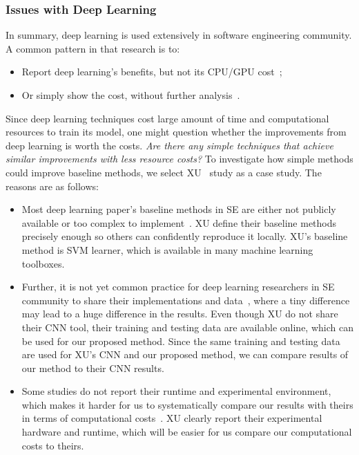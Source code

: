 \documentclass[sigconf]{acmart}
\theoremstyle{break}
\newcommand{\bi}{\begin{itemize}[leftmargin=0.4cm]}
\newcommand{\ei}{\end{itemize}}
\begin{document}
 \subsubsection{Issues with Deep Learning}
 In summary,  deep learning is used extensively in software
 engineering community.  A common pattern
 in that research is to:
 \bi
 \item
 Report deep learning's benefits, but not  its CPU/GPU cost~\cite{white2015toward,choetkiertikul2016deep,yuan2014droid,mou2016convolutional};
 \item
 Or simply show the cost, without further analysis~\cite{wang2016automatically, lam2015combining, gu2016deep, xu2016predicting, white2016deep}.
 \ei
Since  deep learning techniques cost large amount of time and computational
resources to train its model,
one might question whether the improvements from deep learning is worth
the costs. {\it Are there any simple techniques that achieve similar improvements
with less resource costs?} To investigate how simple methods could improve baseline
methods, we select XU~\cite{xu2016predicting} study as a case study. The reasons
are as follows:
\bi 
 
\item Most deep learning paper's baseline methods in SE are either not publicly available or too complex to implement~\cite{white2016deep,lam2015combining}. XU define their baseline methods precisely enough so others can confidently reproduce it locally.
XU's baseline method is SVM learner, which is available in many machine learning toolboxes.

\item
Further, it is not
yet common practice for deep learning researchers in SE community
to share their implementations and data~\cite{white2016deep,white2015toward,lam2015combining,wang2016automatically,choetkiertikul2016deep,gu2016deep}, where a tiny difference may lead to a huge difference in the results. Even though XU do not share their CNN tool, their
training and testing data are available online, which can be used for our proposed method. Since the same training and testing data are used for XU's CNN and our proposed method,  we can compare results of our method to their CNN results.
\item Some studies do not report their runtime and experimental environment, which makes it harder for us
to systematically compare our results with theirs in terms of computational costs~\cite{choetkiertikul2016deep,yuan2014droid,white2015toward, mou2016convolutional}.
XU clearly report their experimental hardware and runtime, which will be easier for us compare our computational costs to theirs.
\ei
\end{document}
